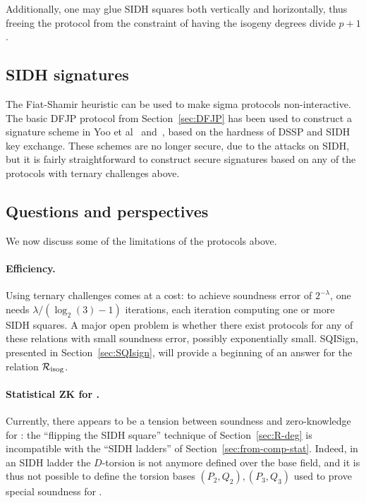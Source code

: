 Additionally, one may glue SIDH squares both vertically and
horizontally, thus freeing the protocol from the constraint of having
the isogeny degrees divide $p+1$.


\subsection{SIDH signatures}

The Fiat-Shamir heuristic can be used to make sigma protocols non-interactive.
The basic DFJP protocol from Section~\ref{sec:DFJP} has been used to construct a signature scheme in Yoo et al~\cite{YAJJS17} and~\cite{GPS20}, based on the hardness of DSSP and SIDH key exchange.
These schemes are no longer secure, due to the attacks on SIDH, but it is fairly straightforward to construct secure signatures based on any of the protocols with ternary challenges above.



%
%


\subsection{Questions and perspectives}

We now discuss some of the limitations of the protocols above.

\paragraph{Efficiency.}
Using ternary challenges comes at a cost: to achieve soundness error of $2^{-\lambda}$, one needs $\lambda/(\log_2(3)-1)$ iterations, each iteration computing one or more SIDH squares.
A major open problem is whether there exist protocols for any of these relations with small soundness error, possibly exponentially small.
SQISign, presented in Section~\ref{sec:SQIsign}, will provide a beginning of an answer for the relation $\R[isog]$.

\paragraph{Statistical ZK for \R[deg].}
Currently, there appears to be a tension between soundness and
zero-knowledge for \R[deg]: the ``flipping the SIDH square'' technique
of Section~\ref{sec:R-deg} is incompatible with the ``SIDH ladders''
of Section~\ref{sec:from-comp-stat}.  Indeed, in an SIDH ladder the
$D$-torsion is not anymore defined over the base field, and it is thus
not possible to define the torsion bases $(P_2,Q_2),(P_3,Q_3)$ used to
prove special soundness for \R[deg].

